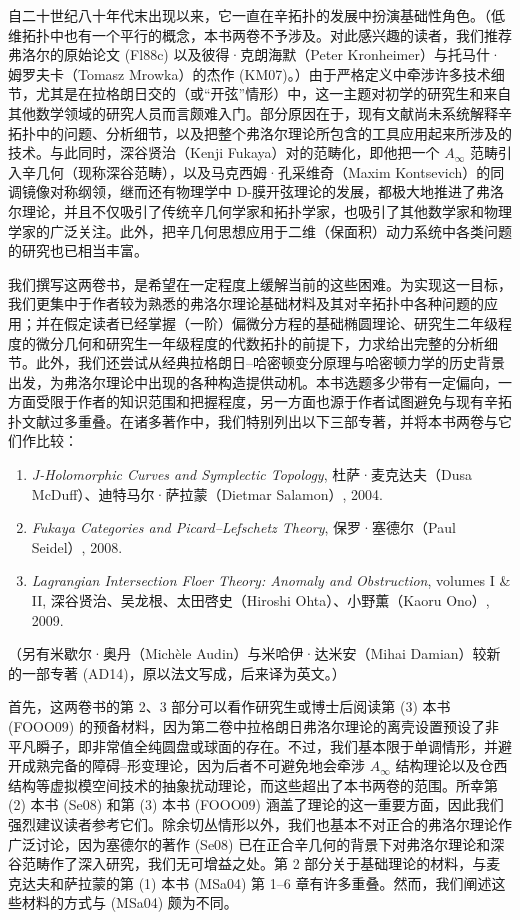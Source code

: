 自二十世纪八十年代末\termFloerHomology{}出现以来，它一直在辛拓扑的发展中扮演基础性角色。（低维拓扑中也有一个平行的概念，本书两卷不予涉及。对此感兴趣的读者，我们推荐弗洛尔的原始论文 (Fl88c) 以及彼得·克朗海默（Peter Kronheimer）与托马什·姆罗夫卡（Tomasz Mrowka）的杰作 (KM07)。）由于严格定义中牵涉许多技术细节，尤其是在拉格朗日交的\termFloerHomology{}（或“开弦”情形）中，这一主题对初学的研究生和来自其他数学领域的研究人员而言颇难入门。部分原因在于，现有文献尚未系统解释辛拓扑中的问题、分析细节，以及把整个弗洛尔理论所包含的工具应用起来所涉及的技术。与此同时，深谷贤治（Kenji Fukaya）对\termFloerHomology{}的范畴化，即他把一个 $A_\infty$ 范畴引入辛几何（现称深谷范畴），以及马克西姆·孔采维奇（Maxim Kontsevich）的同调镜像对称纲领，继而还有物理学中 D-膜开弦理论的发展，都极大地推进了弗洛尔理论，并且不仅吸引了传统辛几何学家和拓扑学家，也吸引了其他数学家和物理学家的广泛关注。此外，把辛几何思想应用于二维（保面积）动力系统中各类问题的研究也已相当丰富。

我们撰写这两卷书，是希望在一定程度上缓解当前的这些困难。为实现这一目标，我们更集中于作者较为熟悉的弗洛尔理论基础材料及其对辛拓扑中各种问题的应用；并在假定读者已经掌握（一阶）偏微分方程的基础椭圆理论、研究生二年级程度的微分几何和研究生一年级程度的代数拓扑的前提下，力求给出完整的分析细节。此外，我们还尝试从经典拉格朗日--哈密顿变分原理与哈密顿力学的历史背景出发，为弗洛尔理论中出现的各种构造提供动机。本书选题多少带有一定偏向，一方面受限于作者的知识范围和把握程度，另一方面也源于作者试图避免与现有辛拓扑文献过多重叠。在诸多著作中，我们特别列出以下三部专著，并将本书两卷与它们作比较：

\begin{enumerate}[label=(\arabic*)]
  \item \emph{J-Holomorphic Curves and Symplectic Topology}, 杜萨·麦克达夫（Dusa McDuff）、迪特马尔·萨拉蒙（Dietmar Salamon）, 2004.
  \item \emph{Fukaya Categories and Picard--Lefschetz Theory}, 保罗·塞德尔（Paul Seidel）, 2008.
  \item \emph{Lagrangian Intersection Floer Theory: Anomaly and Obstruction}, volumes I \& II, 深谷贤治、吴龙根、太田啓史（Hiroshi Ohta）、小野薫（Kaoru Ono）, 2009.
\end{enumerate}

（另有米歇尔·奥丹（Michèle Audin）与米哈伊·达米安（Mihai Damian）较新的一部专著 (AD14)，原以法文写成，后来译为英文。）

首先，这两卷书的第 2、3 部分可以看作研究生或博士后阅读第 (3) 本书 (FOOO09) 的预备材料，因为第二卷中拉格朗日弗洛尔理论的离壳设置预设了非平凡瞬子，即非常值全纯圆盘或球面的存在。不过，我们基本限于单调情形，并避开成熟完备的\termFloerHomology{}障碍--形变理论，因为后者不可避免地会牵涉 $A_\infty$ 结构理论以及仓西结构等虚拟模空间技术的抽象扰动理论，而这些超出了本书两卷的范围。所幸第 (2) 本书 (Se08) 和第 (3) 本书 (FOOO09) 涵盖了理论的这一重要方面，因此我们强烈建议读者参考它们。除余切丛情形以外，我们也基本不对正合\termLagrangianSubmanifold{}的弗洛尔理论作广泛讨论，因为塞德尔的著作 (Se08) 已在正合辛几何的背景下对弗洛尔理论和深谷范畴作了深入研究，我们无可增益之处。第 2 部分关于基础\termPseudoholomorphicCurve{}理论的材料，与麦克达夫和萨拉蒙的第 (1) 本书 (MSa04) 第 1--6 章有许多重叠。然而，我们阐述这些材料的方式与 (MSa04) 颇为不同。

